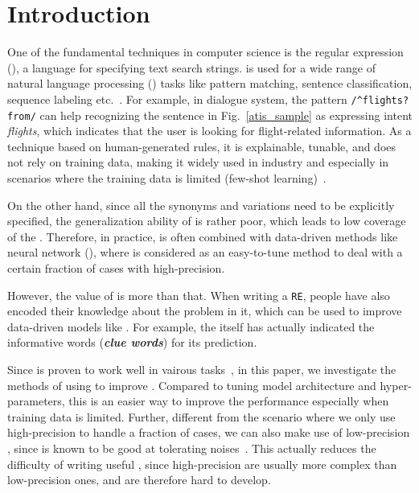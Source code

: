 \section{Introduction}


One of the fundamental techniques in computer science is the regular expression (\RE), a language for specifying text search strings.  \RE is used for a wide range of natural language processing (\NLP) tasks like pattern matching, sentence classification, sequence labeling etc.~\cite{chang2014tokensregex}. 
For example, in dialogue system, the \RE pattern \texttt{/\textasciicircum flights? from/} can help
recognizing the sentence in Fig.~\ref{atis_sample} as expressing intent \emph{flights}, which indicates that the user is looking for
flight-related information. As a technique based on human-generated rules, it is explainable, tunable, and does not rely on training data,
making it widely used in industry and especially in scenarios where the training data is limited (few-shot learning)~\cite{gc2015big}.

On the other hand, since all the synonyms and variations need to be explicitly specified, the generalization ability of \RE is rather poor,
which leads to low coverage of the \REs. Therefore, in practice, \RE is often combined with data-driven methods like neural network
(\NN), where \RE is considered as an easy-to-tune method to deal with a certain fraction of cases with high-precision.

However, the value of \RE is more than that. When writing a \texttt{RE}, people have also encoded their knowledge about the problem in it, which can be used to improve data-driven models like \NN. For example, the \RE itself has actually indicated the informative words
(\textbf{\emph{clue words}}) for its prediction.

Since \NN is proven to work well in vairous \NLP tasks~\cite{goldberg2017neural}, in this paper,
we investigate the methods of using \RE to improve \NN.
Compared to tuning model architecture and hyper-parameters, this is an easier way to improve the \NN performance especially when training data is limited.
Further, different from the scenario where we only use high-precision
\REs to handle a fraction of cases, we can also make use of low-precision \REs, since \NN is known to be good at
tolerating noises~\cite{xie2016disturblabel}. This actually reduces the difficulty of writing useful \REs, since high-precision \REs
are usually more complex than low-precision ones, and are therefore hard to develop.

